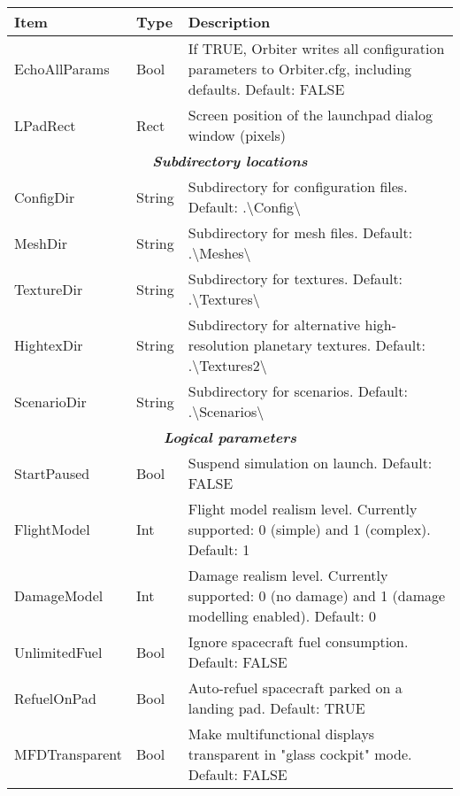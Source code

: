 \documentclass[Orbiter User Manual.tex]{subfiles}
\begin{document}
	\begin{longtable}{ |p{}|p{}|p{}| }
	\hline\rule{0pt}{2ex}
	\textbf{Item} & \textbf{Type} & \textbf{Description}\\
	\hline\rule{0pt}{2ex}
	EchoAllParams & Bool & If TRUE, Orbiter writes all configuration parameters to Orbiter.cfg, including defaults. Default: FALSE\\
	\hline\rule{0pt}{2ex}
	LPadRect & Rect & Screen position of the launchpad dialog window (pixels)\\
	\hline
	\multicolumn{3}{|c|}{\rule{0pt}{2ex}\textbf{\textit{Subdirectory locations}}}\\
	\hline\rule{0pt}{2ex}
	ConfigDir & String & Subdirectory for configuration files. Default: .\textbackslash Config\textbackslash\\
	\hline\rule{0pt}{2ex}
	MeshDir & String & Subdirectory for mesh files. Default: .\textbackslash Meshes\textbackslash\\
	\hline\rule{0pt}{2ex}
	TextureDir & String & Subdirectory for textures. Default: .\textbackslash Textures\textbackslash\\
	\hline\rule{0pt}{2ex}
	HightexDir & String & Subdirectory for alternative high-resolution planetary textures. Default: .\textbackslash Textures2\textbackslash\\
	\hline\rule{0pt}{2ex}
	ScenarioDir & String & Subdirectory for scenarios. Default: .\textbackslash Scenarios\textbackslash\\
	\hline
	\multicolumn{3}{|c|}{\rule{0pt}{2ex}\textbf{\textit{Logical parameters}}}\\
	\hline\rule{0pt}{2ex}
	StartPaused & Bool & Suspend simulation on launch. Default: FALSE\\
	\hline\rule{0pt}{2ex}
	FlightModel & Int & Flight model realism level. Currently supported: 0 (simple) and 1 (complex). Default: 1\\
	\hline\rule{0pt}{2ex}
	DamageModel & Int & Damage realism level. Currently supported: 0 (no damage) and 1 (damage modelling enabled). Default: 0\\
	\hline\rule{0pt}{2ex}
	UnlimitedFuel & Bool & Ignore spacecraft fuel consumption. Default: FALSE\\
	\hline\rule{0pt}{2ex}
	RefuelOnPad & Bool & Auto-refuel spacecraft parked on a landing pad. Default: TRUE\\
	\hline\rule{0pt}{2ex}
	MFDTransparent & Bool & Make multifunctional displays transparent in "glass cockpit" mode. Default: FALSE\\

\end{longtable}
\end{document}
